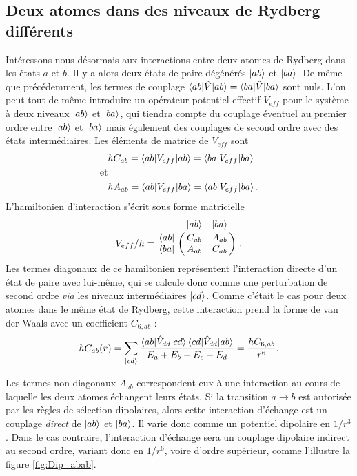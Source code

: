 \subsection{Deux atomes dans des niveaux de Rydberg différents}
\label{subsec:interaction_diff_levels}
Intéressons-nous désormais aux interactions entre deux atomes de Rydberg dans les états $a$ et $b$.
Il y a alors deux états de paire dégénérés $\ket{ab}$ et $\ket{ba}$.
De même que précédemment, les termes de couplage $\braket{ab|\hat{V}|ab}=\braket{ba|\hat{V}|ba}$ sont nuls.
L'on peut tout de même introduire un opérateur potentiel effectif $V_{eff}$ pour le système à deux niveaux $\ket{ab}$ et $\ket{ba}$, qui tiendra compte du couplage éventuel au premier ordre entre $\ket{ab}$ et $\ket{ba}$ mais également des couplages de second ordre avec des états intermédiaires.
Les éléments de matrice de $V_{eff}$ sont
%
\begin{equation}\label{eq:Cab_Aab}
\begin{aligned}
&hC_{ab}=\braket{ab|V_{eff}|ab}=\braket{ba|V_{eff}|ba} \\
\text{et} &\\
&hA_{ab}=\braket{ab|V_{eff}|ba}=\braket{ab|V_{eff}|ba}.
\end{aligned}
\end{equation}
%
L'hamiltonien d'interaction s'écrit sous forme matricielle
\begin{equation}\label{eq:MatrixCab_Aab}
V_{eff}/h = \bordermatrix{~ 	&\ket{ab} 	& \ket{ba} \cr
	\bra{ab}		&C_{ab} 		&A_{ab}	\cr 
	\bra{ba} 		&A_{ab} 		&C_{ab} \cr} \ .
\end{equation}
%
Les termes diagonaux de ce hamiltonien représentent l'interaction directe d'un état de paire avec lui-même, qui se calcule donc comme une perturbation de second ordre \textit{via} les niveaux intermédiaires $\ket{cd}$.
Comme c'était le cas pour deux atomes dans le même état de Rydberg, cette interaction prend la forme de van der Waals avec un coefficient $C_{6,ab}$ :
\begin{equation}\label{eq:VdW_abab}
hC_{ab}(r)=\sum_{\ket{cd}}{\frac{\braket{ab|\hat{V}_{dd}|cd}\braket{cd|\hat{V}_{dd}|ab}}{E_a + E_b - E_c - E_d}}  = \frac{hC_{6,ab}}{r^6}.
\end{equation}

Les termes non-diagonaux $A_{ab}$ correspondent eux à une interaction au cours de laquelle les deux atomes échangent leurs états.
Si la transition $a\rightarrow b$ est autorisée par les règles de sélection dipolaires, alors cette interaction d'échange est un couplage \textit{direct} de $\ket{ab}$ et $\ket{ba}$.
Il varie donc comme un potentiel dipolaire en $1/r^3$.
Dans le cas contraire, l'interaction d'échange sera un couplage dipolaire indirect au second ordre, variant donc en $1/r^6$, voire d'ordre supérieur, comme l'illustre la figure \eqref{fig:Dip_abab}.

